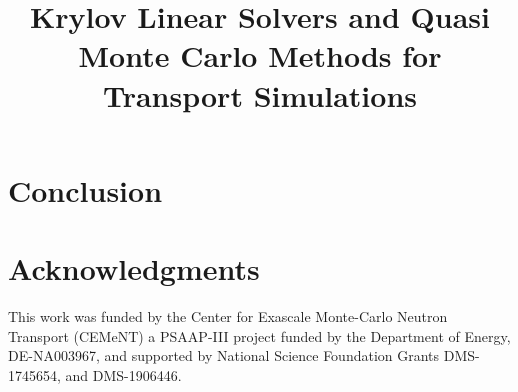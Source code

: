 \documentclass{nseJournal}
\begin{document}
\title{Krylov Linear Solvers and Quasi Monte Carlo
Methods for Transport Simulations}


{}


\titlePage

\begin{abstract}

\end{abstract}










\clearpage


\section{Conclusion}
\label{sec:conclusion}


\pagebreak
\section*{Acknowledgments}


This work was funded by the Center for Exascale Monte-Carlo Neutron Transport (CEMeNT) a PSAAP-III project funded by the Department of Energy, DE-NA003967, 
%
and supported by National Science Foundation Grants
DMS-1745654,
and
DMS-1906446.


\pagebreak

\end{document}
